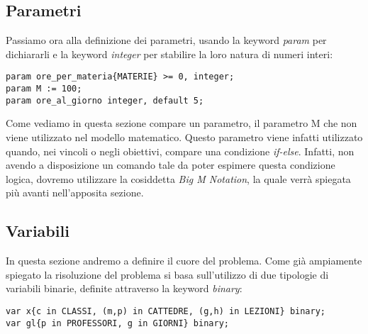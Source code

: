 \documentclass{article}
\begin{document}
\subsection{Parametri}
Passiamo ora alla definizione dei parametri, usando la keyword \emph{param} per dichiararli e la keyword \emph{integer} per stabilire la loro natura di numeri interi:
\begin{verbatim}
param ore_per_materia{MATERIE} >= 0, integer;
param M := 100;
param ore_al_giorno integer, default 5;
\end{verbatim}
Come vediamo in questa sezione compare un parametro, il parametro M che non viene utilizzato nel modello matematico. Questo parametro viene infatti utilizzato quando, nei vincoli o negli obiettivi, compare una condizione \emph{if-else}. Infatti, non avendo a disposizione un comando tale da poter espimere questa condizione logica, dovremo utilizzare la cosiddetta \emph{Big M Notation}, la quale verrà spiegata più avanti nell'apposita sezione.

\subsection{Variabili}
In questa sezione andremo a definire il cuore del problema. Come già ampiamente spiegato la risoluzione del problema si basa sull'utilizzo di due tipologie di variabili binarie, definite attraverso la keyword \emph{binary}:
\begin{verbatim}
var x{c in CLASSI, (m,p) in CATTEDRE, (g,h) in LEZIONI} binary;
var gl{p in PROFESSORI, g in GIORNI} binary;
\end{verbatim}
\end{document}
